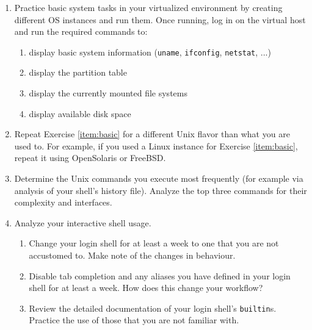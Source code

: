 \begin{enumerate}

\item
\label{item:basic}
Practice basic system tasks in your virtualized
environment by creating different OS instances and run
them.  Once running, log in on the virtual host and
run the required commands to:

\begin{enumerate}

\item display basic system information (\verb+uname+,
\verb+ifconfig+, \verb+netstat+, ...)

\item
display the partition table

\item
display the currently mounted file systems

\item
display available disk space
\end{enumerate}

\item Repeat Exercise \ref{item:basic} for a different
Unix flavor than what you are used to.  For example,
if you used a Linux instance for Exercise
\ref{item:basic}, repeat it using OpenSolaris or
FreeBSD.

\item Determine the Unix commands you execute most
frequently (for example via analysis of your shell's
history file).  Analyze the top three commands for
their complexity and interfaces.

\item Analyze your interactive shell usage.
\begin{enumerate}

\item Change your login shell for at least a week to
one that you are not accustomed to.  Make note of the
changes in behaviour.

\item Disable tab completion and any aliases you have
defined in your login shell for at least a week.  How
does this change your workflow?

\item Review the detailed documentation of your login
shell's \verb+builtin+s.  Practice the use of those
that you are not familiar with.

\end{enumerate}

\end{enumerate}

